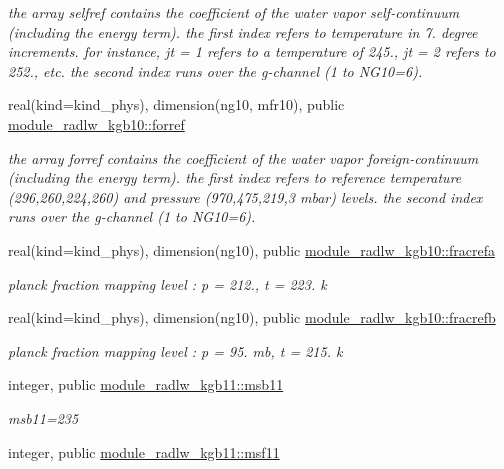 \begin{Indent}
\begin{DoxyCompactItemize}
\begin{DoxyCompactList}\small\item\em the array selfref contains the coefficient of the water vapor self-\/continuum (including the energy term). the first index refers to temperature in 7. degree increments. for instance, jt = 1 refers to a temperature of 245., jt = 2 refers to 252., etc. the second index runs over the g-\/channel (1 to N\+G10=6). \end{DoxyCompactList}\item 
real(kind=kind\+\_\+phys), dimension(ng10, mfr10), public \hyperlink{group__module__radlw__kgbnn_gaf70e39048d571053790289549dd8333a}{module\+\_\+radlw\+\_\+kgb10\+::forref}
\begin{DoxyCompactList}\small\item\em the array forref contains the coefficient of the water vapor foreign-\/continuum (including the energy term). the first index refers to reference temperature (296,260,224,260) and pressure (970,475,219,3 mbar) levels. the second index runs over the g-\/channel (1 to N\+G10=6). \end{DoxyCompactList}\item 
real(kind=kind\+\_\+phys), dimension(ng10), public \hyperlink{group__module__radlw__kgbnn_gaa8bbfdaf370e12ae26d2ee3c464bdbc2}{module\+\_\+radlw\+\_\+kgb10\+::fracrefa}
\begin{DoxyCompactList}\small\item\em planck fraction mapping level \+: p = 212., t = 223. k \end{DoxyCompactList}\item 
real(kind=kind\+\_\+phys), dimension(ng10), public \hyperlink{group__module__radlw__kgbnn_ga07d5bac00d30f1ab873a0542b28d7e83}{module\+\_\+radlw\+\_\+kgb10\+::fracrefb}
\begin{DoxyCompactList}\small\item\em planck fraction mapping level \+: p = 95. mb, t = 215. k \end{DoxyCompactList}\item 
integer, public \hyperlink{group__module__radlw__kgbnn_gaa8630868015cb7e358107e6418e35276}{module\+\_\+radlw\+\_\+kgb11\+::msb11}
\begin{DoxyCompactList}\small\item\em msb11=235 \end{DoxyCompactList}\item 
integer, public \hyperlink{group__module__radlw__kgbnn_ga7dcec9b9f19a3f5f13d443572d834628}{module\+\_\+radlw\+\_\+kgb11\+::msf11}

\end{DoxyCompactItemize}
\end{Indent}
